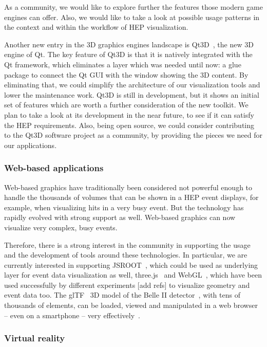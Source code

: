 \documentclass[12pt,a4paper]{article}
\begin{document}
As a community, we would like to explore further the features those modern game engines can offer. Also, we would like to take a
look at possible usage patterns in the context and within the workflow of HEP visualization.

Another new entry in the 3D graphics engines landscape is Qt3D~\cite{Qt3d},  the new 3D engine of Qt. The key feature of
Qt3D is that it is natively integrated with the Qt framework, which eliminates a layer which was needed until now: a glue
package to connect the Qt GUI with the window showing the 3D content. By eliminating that, we could simplify the architecture
of our visualization tools and lower the maintenance work. Qt3D is still in development, but it shows an initial set of
features which are worth a further consideration of the new toolkit. We plan to take a look at its development in the near future,
to see if it can satisfy the HEP requirements. Also, being open source, we could consider contributing to the Qt3D software
project as a community, by providing the pieces we need for our applications.

\hypertarget{web-based}{%
\subsubsection{Web-based applications}\label{web-based}}

Web-based graphics have traditionally been considered not powerful enough to handle the thousands of volumes that can be
shown in a HEP event displays, for example, when visualizing hits in a very busy event. But the technology has rapidly
evolved with strong support as well. Web-based graphics can now visualize very complex, busy events.

Therefore, there is a strong interest in the community in supporting the usage and the development of tools around
these technologies. In particular, we are currently interested in supporting JSROOT~\cite{rootjs}, which could be used as
underlying layer for event data visualization as well, three.js~\cite{ThreeJS} and WebGL~\cite{WebGL2011}, which have been
used successfully by different experiments [add refs] to visualize geometry and event data too. The glTF~\cite{glTF} 3D model
of the Belle II detector~\cite{BelleII}, with tens of thousands of elements, can be loaded, viewed and manipulated in a web
browser – even on a smartphone – very effectively~\cite{SketchFabBelleII}.

\hypertarget{vr}{%
\subsubsection{Virtual reality}\label{vr}}
\end{document}
